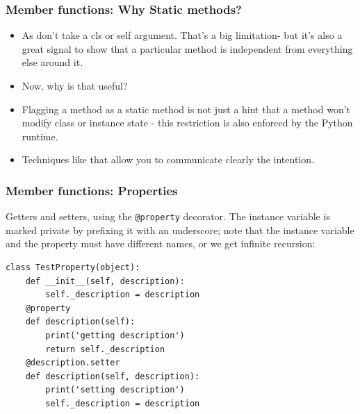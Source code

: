 \begin{frame}[fragile]\frametitle{Member functions: Why Static methods?}
   \begin{itemize}
  \item As don't take a cls or self argument. That's a big limitation- but it's also a great signal to show that a particular method is independent from everything else around it.
	\item Now, why is that useful?
	\item Flagging a method as a static method is not just a hint that a method won't modify class or instance state - this restriction is also enforced by the Python runtime.
	\item Techniques like that allow you to communicate clearly the intention.
  \end{itemize}

\end{frame}


\begin{frame}[fragile]\frametitle{Member functions: Properties}
Getters and setters, using the \texttt{@property} decorator. The instance variable is marked
private by prefixing it with an underscore; note that the instance variable and the property
must have different names, or we get infinite recursion:
\begin{lstlisting}
class TestProperty(object):
    def __init__(self, description):
        self._description = description
    @property
    def description(self):
        print('getting description')
        return self._description
    @description.setter
    def description(self, description):
        print('setting description')
        self._description = description
\end{lstlisting}
\end{frame}

